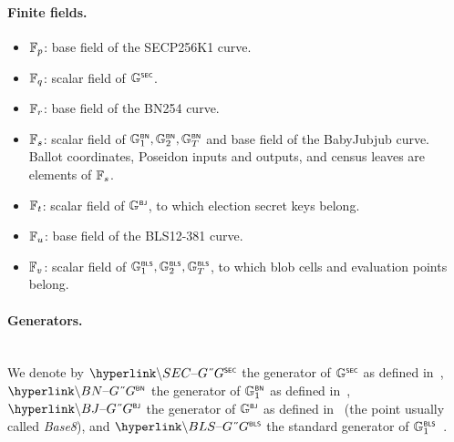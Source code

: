 \paragraph{Finite fields.}
\begin{itemize}
	\item $\mathbb{F}_p$: base field of the SECP256K1 curve.
	\item $\mathbb{F}_q$: scalar field of ${\mathbb{G}}^{\text{\tiny \sf SEC}}$.
	\item $\mathbb{F}_r$: base field of the BN254 curve.
	\item $\mathbb{F}_s$: scalar field of ${\mathbb{G}}^{\text{\tiny \sf BN}}_1, {\mathbb{G}}^{\text{\tiny \sf BN}}_2, {\mathbb{G}}^{\text{\tiny \sf BN}}_T$ and base field of the BabyJubjub curve. Ballot coordinates, Poseidon inputs and outputs, and census leaves are elements of $\mathbb{F}_s$.
	\item $\mathbb{F}_t$: scalar field of ${\mathbb{G}}^{\text{\tiny \sf BJ}}$, to which election secret keys belong.
	\item $\mathbb{F}_u$: base field of the BLS12-381 curve.
	\item $\mathbb{F}_v$: scalar field of ${\mathbb{G}}^{\text{\tiny \sf BLS}}_1, {\mathbb{G}}^{\text{\tiny \sf BLS}}_2, {\mathbb{G}}^{\text{\tiny \sf BLS}}_T$, to which blob cells and evaluation points belong.
\end{itemize}

\paragraph{Generators.}\mbox{}\\

\noi We denote by $\hlget{\SEC{G}}$ the generator of ${\mathbb{G}}^{\text{\tiny \sf SEC}}$ as defined in~\cite{brown2010sec}, $\hlget{\BN{G}}$ the generator of ${\mathbb{G}}^{\text{\tiny \sf BN}}_1$ as defined in~\cite{wood2014ethereum}, $\hlget{\BJ{G}}$ the generator of ${\mathbb{G}}^{\text{\tiny \sf BJ}}$ as defined in~\cite{erc2494} (the point usually called \emph{Base8}), and $\hlget{\BLS{G}}$ the standard generator of ${\mathbb{G}}^{\text{\tiny \sf BLS}}_1$~\cite{eip4844}.

